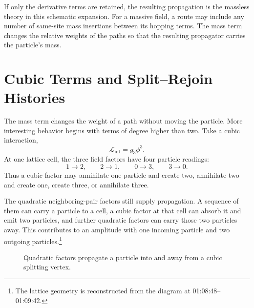If only the derivative terms are retained, the resulting propagation is the massless theory in this schematic expansion. For a massive field, a route may include any number of same-site mass insertions between its hopping terms. The mass term changes the relative weights of the paths so that the resulting propagator carries the particle's mass.

\section{Cubic Terms and Split--Rejoin Histories}

The mass term changes the weight of a path without moving the particle. More interesting behavior begins with terms of degree higher than two. Take a cubic interaction,
\begin{equation}
\mathcal{L}_{\mathrm{int}}=g_3\phi^3.
\end{equation}
At one lattice cell, the three field factors have four particle readings:
\begin{equation}
1\longrightarrow 2,
\qquad
2\longrightarrow 1,
\qquad
0\longrightarrow 3,
\qquad
3\longrightarrow 0.
\end{equation}
Thus a cubic factor may annihilate one particle and create two, annihilate two and create one, create three, or annihilate three.

The quadratic neighboring-pair factors still supply propagation. A sequence of them can carry a particle to a cell, a cubic factor at that cell can absorb it and emit two particles, and further quadratic factors can carry those two particles away. This contributes to an amplitude with one incoming particle and two outgoing particles.\footnote{The lattice geometry is reconstructed from the diagram at 01:08:48--01:09:42.}

\begin{figure}[htbp]
\centering
{}
\caption{Quadratic factors propagate a particle into and away from a cubic splitting vertex.}
\end{figure}

